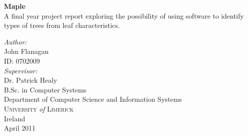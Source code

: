 \begin{titlepage}
 
\begin{center}
 
 
 
 
 
 
{ \Huge \bfseries{Maple}}\\[1.0cm]
   A final year project report exploring the possibility of using software to identify types of trees from leaf characteristics.\\[1cm]
 

\vfill

\emph{Author:}\\
John Flanagan\\
ID: 0702009\\[1.0cm]
\emph{Supervisor:}\\
Dr. Patrick Healy\\[2.0cm]

 

 
B.Sc. in Computer Systems\\
Department of Computer Science and Information Systems\\
\textsc{University} \textit{of} \textsc{Limerick}\\
Ireland\\[1.0cm]
April 2011
 
\end{center}
 
\end{titlepage}
